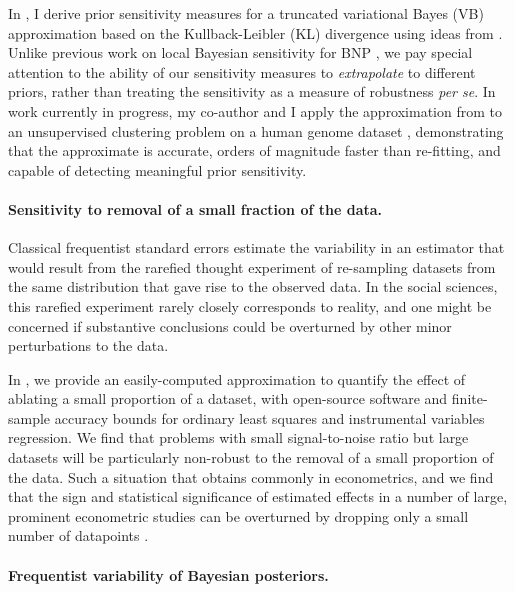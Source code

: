 In \citep{giordano:2018:bnpsensitivity}, I derive prior sensitivity measures for
a truncated variational Bayes (VB) approximation based on the Kullback-Leibler
(KL) divergence using ideas from \citep{gustafson:1996:localposterior,
giordano:2018:covariances}. Unlike previous work on local Bayesian sensitivity
for BNP \citep{Basu:2000:BNP_robustness}, we pay special attention to the
ability of our sensitivity measures to \emph{extrapolate} to different priors,
rather than treating the sensitivity as a measure of robustness \textit{per se}.
In work currently in progress, my co-author and I apply the approximation from
\citep{giordano:2018:bnpsensitivity} to an unsupervised clustering problem on a
human genome dataset \citep{huang:2011:haplotype, raj:2014:faststructure},
demonstrating that the approximate is accurate, orders of magnitude faster than
re-fitting, and capable of detecting meaningful prior sensitivity.




\newpage

\paragraph{Sensitivity to removal of a small fraction of the data.} Classical
frequentist standard errors estimate the variability in an estimator that would
result from the rarefied thought experiment of re-sampling datasets from the same
distribution that gave rise to the observed data.  In the social sciences, this
rarefied experiment rarely closely corresponds to reality, and one might be
concerned if substantive conclusions could be overturned by other minor
perturbations to the data.

In \citet{giordano:2020:amip}, we provide an easily-computed approximation to
quantify the effect of ablating a small proportion of a dataset, with
open-source software and finite-sample accuracy bounds for ordinary least
squares and instrumental variables regression. We find that problems with small
signal-to-noise ratio but large datasets will be particularly non-robust to the
removal of a small proportion of the data. Such a situation that obtains
commonly in econometrics, and we find that the sign and statistical significance
of estimated effects in a number of large, prominent econometric studies can be
overturned by dropping only a small number of datapoints
\citep{angelucci:2009:indirect, finkelstein:2012:oregon, meager:2019:microcredit}.


\paragraph{Frequentist variability of Bayesian posteriors.}

